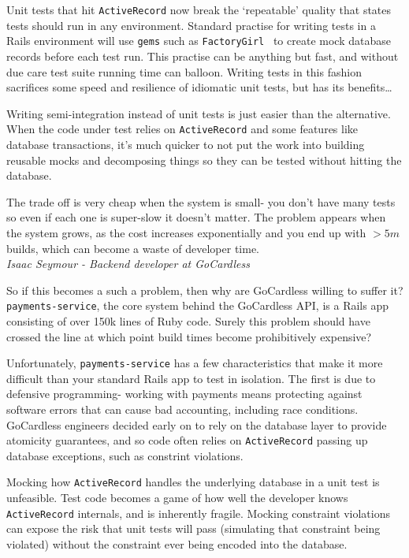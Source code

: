\documentclass[11pt]{article}
\begin{document}
Unit tests that hit \texttt{ActiveRecord} now break the `repeatable' quality
that states tests should run in any environment. Standard practise for writing
tests in a Rails environment will use \texttt{gems} such as
\texttt{FactoryGirl}~\cite{factoryGirl} to create mock database records before
each test run. This practise can be anything but fast, and without due care test
suite running time can balloon. Writing tests in this fashion sacrifices some
speed and resilience of idiomatic unit tests, but has its benefits\dots

\begin{displayquote}

  Writing semi-integration instead of unit tests is just easier than the
  alternative. When the code under test relies on \texttt{ActiveRecord} and some
  features like database transactions, it's much quicker to not put the work
  into building reusable mocks and decomposing things so they can be tested
  without hitting the database.

  The trade off is very cheap when the system is small- you don't have many
  tests so even if each one is super-slow it doesn't matter. The problem appears
  when the system grows, as the cost increases exponentially and you end up with
  $>5m$ builds, which can become a waste of developer time. \\

  \textit{Isaac Seymour - Backend developer at GoCardless}

\end{displayquote}

So if this becomes a such a problem, then why are GoCardless willing to suffer it?
\texttt{payments-service}, the core system behind the GoCardless API, is a Rails app
consisting of over 150k lines of Ruby code. Surely this problem should have
crossed the line at which point build times become prohibitively expensive?

Unfortunately, \texttt{payments-service} has a few characteristics that make it
more difficult than your standard Rails app to test in isolation. The first is
due to defensive programming- working with payments means protecting against
software errors that can cause bad accounting, including race conditions.
GoCardless engineers decided early on to rely on the database layer to provide
atomicity guarantees, and so code often relies on \texttt{ActiveRecord} passing
up database exceptions, such as constrint violations.

Mocking how \texttt{ActiveRecord} handles the underlying database in a unit test
is unfeasible. Test code becomes a game of how well the developer knows
\texttt{ActiveRecord} internals, and is inherently fragile. Mocking constraint
violations can expose the risk that unit tests will pass (simulating that
constraint being violated) without the constraint ever being encoded into the
database.
\end{document}
